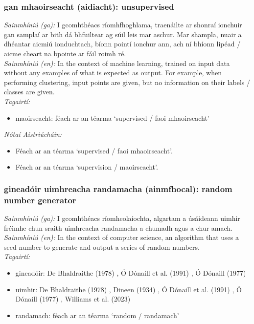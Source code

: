 \subsubsection*{gan mhaoirseacht (aidiacht): unsupervised}
 \noindent \textit{Sainmhíniú (ga):} I gcomhthéacs ríomhfhoghlama, traenáilte ar shonraí ionchuir gan samplaí ar bith dá bhfuiltear ag súil leis mar aschur. Mar shampla, nuair a dhéantar aicmiú ionduchtach, bíonn pointí ionchur ann, ach ní bhíonn lipéad / aicme cheart na bpointe ar fáil roimh ré.
\\
 \noindent \textit{Sainmhíniú (en):} In the context of machine learning, trained on input data without any examples of what is expected as output. For example, when performing clustering, input points are given, but no information on their labels / classes are given.
\\
 \noindent \textit{Tagairtí:}
\begin{itemize}
	\item maoirseacht: féach ar an téarma `supervised / faoi mhaoirseacht'
\end{itemize}

 \noindent \textit{Nótaí Aistriúcháin:}
\begin{itemize}
	\item Féach ar an téarma `supervised / faoi mhaoirseacht'.
	\item Féach ar an téarma `supervision / maoirseacht'.
\end{itemize}


\subsubsection*{gineadóir uimhreacha randamacha (ainmfhocal): random number generator}
 \noindent \textit{Sainmhíniú (ga):} I gcomhthéacs ríomheolaíochta, algartam a úsáideann uimhir fréimhe chun sraith uimhreacha randamacha a chumadh agus a chur amach.
\\
 \noindent \textit{Sainmhíniú (en):} In the context of computer science, an algorithm that uses a seed number to generate and output a series of random numbers.
\\
 \noindent \textit{Tagairtí:}
\begin{itemize}
	\item gineadóir: De Bhaldraithe (1978) \cite{de-bhaldraithe}, Ó Dónaill et al. (1991) \cite{focloir-beag}, Ó Dónaill (1977) \cite{odonaill}
	\item uimhir: De Bhaldraithe (1978) \cite{de-bhaldraithe}, Dineen (1934) \cite{dineen}, Ó Dónaill et al. (1991) \cite{focloir-beag}, Ó Dónaill (1977) \cite{odonaill}, Williams et al. (2023) \cite{storchiste}
	\item randamach: féach ar an téarma `random / randamach'
\end{itemize}

